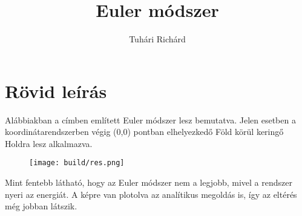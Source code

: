 \documentclass{article}
\title{\textbf{Euler módszer}}
\author{Tuhári Richárd}
\date{}
\begin{document}
\maketitle

\section*{\textbf{Rövid leírás}}

Alábbiakban a címben említett Euler módszer lesz bemutatva. Jelen esetben a koordinátarendszerben végig (0,0) pontban elhelyezkedő Föld körül keringő Holdra lesz alkalmazva.

\begin{center}
\begin{figure}[h!]
\texttt{[image: build/res.png]}
\end{figure}
\end{center}

\newpage

Mint fentebb látható, hogy az Euler módszer nem a legjobb, mivel a rendszer nyeri az energiát. A képre van plotolva az analítikus megoldás is, így az eltérés még jobban látszik.
\end{document}
